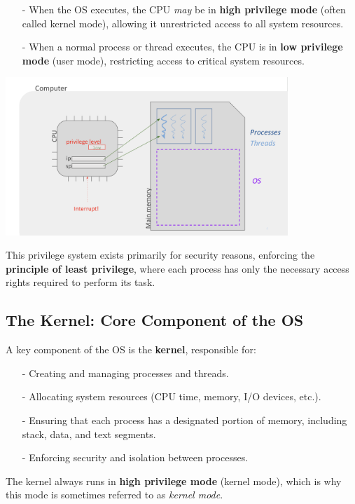 \begin{itemize}
  \item[-] When the OS executes, the CPU \textit{may} be in \textbf{high privilege mode} (often called kernel mode), allowing it unrestricted access to all system resources.
\item[-] When a normal process or thread executes, the CPU is in \textbf{low privilege mode} (user mode), restricting access to critical system resources.
\end{itemize}

\begin{center}
  \includegraphics[width=0.8\textwidth]{chapters/L3/images/priviledge.png}
\end{center}

This privilege system exists primarily for security reasons, enforcing the \textbf{principle of least privilege}, where each process has only the necessary access rights required to perform its task. 

\subsection{The Kernel: Core Component of the OS}

A key component of the OS is the \textbf{kernel}, responsible for:

\begin{itemize}
  \item[-] Creating and managing processes and threads.
  \item[-] Allocating system resources (CPU time, memory, I/O devices, etc.).
  \item[-] Ensuring that each process has a designated portion of memory, including stack, data, and text segments.
  \item[-] Enforcing security and isolation between processes.
\end{itemize}

The kernel always runs in \textbf{high privilege mode} (kernel mode), which is why this mode is sometimes referred to as \textit{kernel mode}. 

